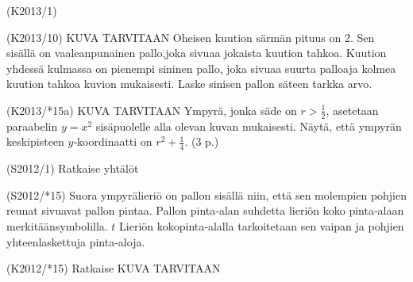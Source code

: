 \begin{tehtava} (K2013/1)
\end{tehtava}


\begin{tehtava}(K2013/10) KUVA TARVITAAN
Oheisen kuution särmän pituus on 2. Sen sisällä on vaaleanpunainen pallo,joka sivuaa jokaista kuution tahkoa. Kuution yhdessä kulmassa on pienempi sininen pallo, joka sivuaa suurta palloaja kolmea kuution tahkoa kuvion mukaisesti. Laske sinisen pallon säteen tarkka arvo. 
\end{tehtava}


\begin{tehtava}(K2013/*15a) KUVA TARVITAAN
Ympyrä, jonka säde on $r>\frac{1}{2}$, asetetaan paraabelin $y=x^2$ sisäpuolelle alla olevan kuvan mukaisesti. Näytä, että ympyrän keskipisteen $y$‐koordinaatti on $r^2+\frac{1}{4}. $ (3
p.)
\end{tehtava}

\begin{tehtava} (S2012/1) Ratkaise yhtälöt
\end{tehtava}

\begin{tehtava}(S2012/*15)
Suora ympyrälieriö on pallon sisällä niin, että sen molempien pohjien reunat sivuavat pallon pintaa. Pallon pinta‐alan suhdetta lieriön koko pinta‐alaan merkitäänsymbolilla. $t$ Lieriön kokopinta‐alalla tarkoitetaan sen vaipan ja pohjien yhteenlaskettuja pinta‐aloja. 
\end{tehtava}

\begin{tehtava} (K2012/*15) Ratkaise   KUVA TARVITAAN
\end{tehtava}


